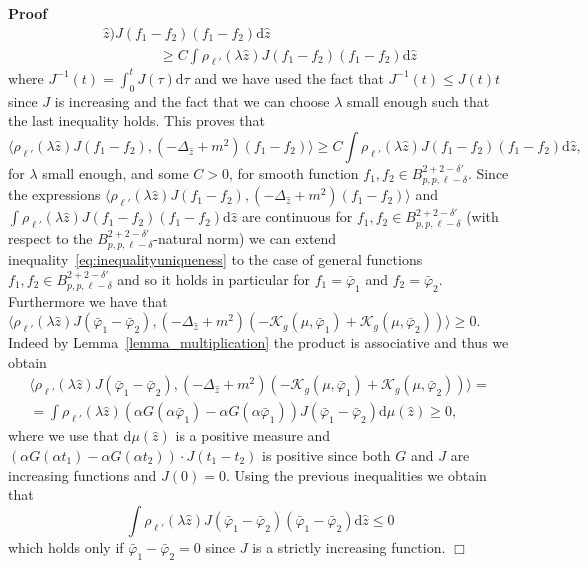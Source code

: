 \documentclass[a4paper,10pt]{article}
\newcommand{\mathd}{\mathrm{d}}
\newenvironment{proof}{\noindent\textbf{Proof\ }}{\hspace*{\fill}$\Box$\medskip}
\begin{document}
\begin{proof}
\[\begin{array}{l}
       \hat{z}) J (f_1 - f_2) (f_1 - f_2) \mathd \hat{z}\\
       \hspace{4em} \geqslant C \int \rho_{\ell'} (\lambda \hat{z}) J (f_1 -
       f_2) (f_1 - f_2) \mathd \hat{z}
     \end{array} \]
  where $J^{- 1} (t) = \int_0^t J (\tau) \mathd \tau$ and we have used the
  fact that $J^{- 1} (t) \leqslant J (t) t$ since $J$ is increasing and the
  fact that we can choose $\lambda$ small enough such that the last inequality
  holds. This proves that
  \begin{equation}
    \langle \rho_{\ell'} (\lambda \hat{z}) J (f_1 - f_2), (- \Delta_{\hat{z}}
    + m^2) (f_1 - f_2) \rangle \geqslant C \int \rho_{\ell'} (\lambda \hat{z})
    J (f_1 - f_2) (f_1 - f_2) \mathd \hat{z} \label{eq:inequalityuniqueness},
  \end{equation}
  for $\lambda$ small enough, and some $C > 0$, for smooth function $f_1, f_2
  \in B^{2 + 2 - \delta'}_{p, p, \ell - \delta}$. Since the expressions
  $\langle \rho_{\ell'} (\lambda \hat{z}) J (f_1 - f_2), (- \Delta_{\hat{z}} +
  m^2) (f_1 - f_2) \rangle$ and $\int \rho_{\ell'} (\lambda \hat{z}) J (f_1 -
  f_2) (f_1 - f_2) \mathd \hat{z}$ are continuous for $f_1, f_2 \in B^{2 + 2 -
  \delta'}_{p, p, \ell - \delta}$ (with respect to the $B^{2 + 2 -
  \delta'}_{p, p, \ell - \delta}$-natural norm) we can extend
  inequality~{\eqref{eq:inequalityuniqueness}} to the case of general
  functions $f_1, f_2 \in B^{2 + 2 - \delta'}_{p, p, \ell - \delta}$ and so it
  holds in particular for $f_1 = \bar{\varphi}_1$ and $f_2 = \bar{\varphi}_2$.
  Furthermore we have that $\langle \rho_{\ell'} (\lambda \hat{z}) J
  (\bar{\varphi}_1 - \bar{\varphi}_2), (- \Delta_{\hat{z}} + m^2) (-
  \mathcal{K}_g (\mu, \bar{\varphi}_1) + \mathcal{K}_g (\mu, \bar{\varphi}_2))
  \rangle \geqslant 0$. Indeed by Lemma~\ref{lemma_multiplication} the product
  is associative and thus we obtain
  \begin{eqnarray}
    & \langle \rho_{\ell'} (\lambda \hat{z}) J (\bar{\varphi}_1 -
    \bar{\varphi}_2), (- \Delta_{\hat{z}} + m^2) (- \mathcal{K}_g (\mu,
    \bar{\varphi}_1) + \mathcal{K}_g (\mu, \bar{\varphi}_2)) \rangle = & 
    \nonumber\\
    & = \int \rho_{\ell'} (\lambda \hat{z}) (\alpha G (\alpha
    \bar{\varphi}_1) - \alpha G (\alpha \bar{\varphi}_1)) J (\bar{\varphi}_1 -
    \bar{\varphi}_2) \mathd \mu (\hat{z}) \geqslant 0, &  \nonumber
  \end{eqnarray}
  where we use that $\mathd \mu (\hat{z})$ is a positive measure and $(\alpha
  G (\alpha t_1) - \alpha G (\alpha t_2)) \cdot J (t_1 - t_2)$ is positive
  since both $G$ and $J$ are increasing functions and $J (0) = 0$. Using the
  previous inequalities we obtain that
  \[ \int \rho_{\ell'} (\lambda \hat{z}) J (\bar{\varphi}_1 -
     \bar{\varphi}_2) (\bar{\varphi}_1 - \bar{\varphi}_2) \mathd \hat{z}
     \leqslant 0 \]
  which holds only if $\bar{\varphi}_1 - \bar{\varphi}_2 = 0$ since $J$ is a
  strictly increasing function. 
\end{proof}
\end{document}
